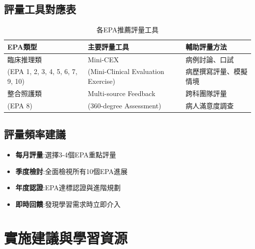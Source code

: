 \documentclass[12pt,a4paper]{article}
\begin{document}
\subsection{評量工具對應表}
\begin{table}[h]
    \centering
    \caption{各EPA推薦評量工具}
    \begin{tabular}{p{4.5cm} p{4cm} p{5.5cm}}
        \toprule
        \textbf{EPA類型} & \textbf{主要評量工具} & \textbf{輔助評量方法} \\
        \midrule
        臨床推理類 & Mini-CEX & 病例討論、口試 \\
        (EPA 1, 2, 3, 4, 5, 6, 7, 9, 10) & (Mini-Clinical Evaluation Exercise) & 病歷撰寫評量、模擬情境 \\
        \midrule
        整合照護類 & Multi-source Feedback & 跨科團隊評量 \\
        (EPA 8) & (360-degree Assessment) & 病人滿意度調查 \\
        \bottomrule
    \end{tabular}
\end{table}

\subsection{評量頻率建議}
\begin{itemize}[nosep]
    \item \textbf{每月評量}:選擇3-4個EPA重點評量
    \item \textbf{季度檢討}:全面檢視所有10個EPA進展
    \item \textbf{年度認證}:EPA達標認證與進階規劃
    \item \textbf{即時回饋}:發現學習需求時立即介入
\end{itemize}

\section{實施建議與學習資源}
\end{document}
